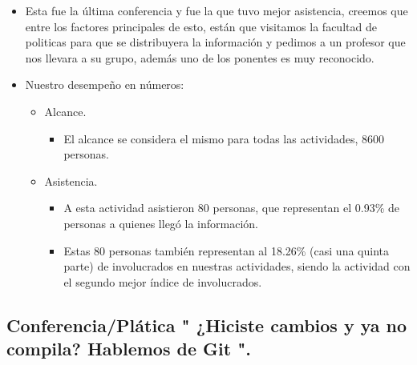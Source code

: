 \documentclass[a4paper,11pt]{article}                 %
\begin{document}
  \begin{itemize}
    \item Esta fue la última conferencia y fue la que tuvo mejor asistencia, creemos que entre los factores principales de esto, están que visitamos la facultad de politicas para que se distribuyera la información y pedimos a un profesor que nos llevara a su grupo, además uno de los ponentes es muy reconocido.
    
    \item Nuestro desempeño en números:
    
    \begin{itemize}
    \item Alcance.
    \begin{itemize}
      \item El alcance se considera el mismo para todas las actividades, 8600 personas.
    \end{itemize}

    \item Asistencia.
    \begin{itemize}
      \item A esta actividad asistieron 80 personas, que representan el 0.93\% de personas a quienes llegó la información.
      \item Estas 80 personas también representan al 18.26\% (casi una quinta parte) de involucrados en nuestras actividades, siendo la actividad con el segundo mejor índice de involucrados. 
    \end{itemize}
    \end{itemize} 
    
  \end{itemize}
  
  \subsection{Conferencia/Plática " ¿Hiciste cambios y ya no compila? Hablemos de Git ".} 
  
\end{document}
